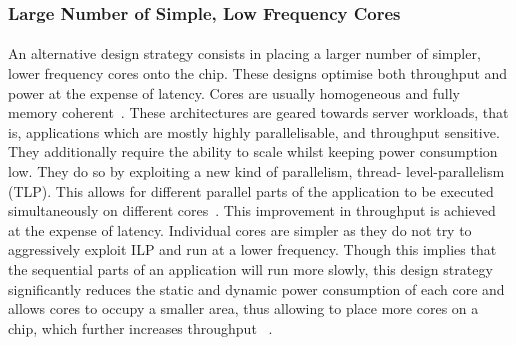 \subsubsection{Large Number of Simple, Low Frequency Cores} 
\paragraph{} An alternative
design strategy consists in placing a larger number of simpler, lower frequency cores
onto the chip. These designs optimise both throughput and power at the expense of latency.
Cores are  usually homogeneous and fully memory coherent~\cite{Vajda:1414193}. These architectures are
geared towards server workloads, that is, applications which  are mostly highly 
parallelisable, and throughput sensitive. They additionally require the ability
to scale whilst keeping power consumption low.  They do so by exploiting a new kind of parallelism, thread-
level-parallelism (TLP). This allows for different parallel parts of the application
to be executed simultaneously on different cores~\cite{Borkar:2007:TCC:1278480.1278667}. This improvement in 
throughput is achieved at the
expense of latency. Individual cores are simpler as they do not try to aggressively
exploit ILP and run at a lower frequency. Though this implies that the
sequential parts of an application will run more slowly, this design
strategy significantly  reduces the static and dynamic
power consumption of each core and allows cores to occupy a smaller
area, thus allowing to place more cores on a chip, which further increases throughput
~\cite{Borkar:2007:TCC:1278480.1278667,4563876}. 


